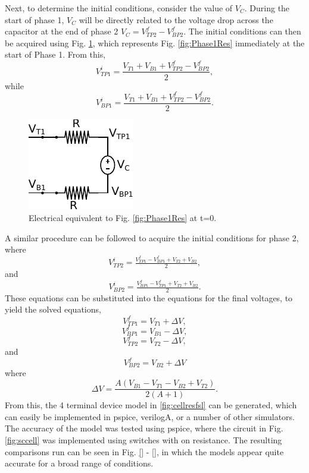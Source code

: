 	Next, to determine the initial conditions, consider the value of $V_{C}$. During the start of phase 1, $V_C$ will be directly related to the voltage drop across the capacitor at the end of phase 2 $V_C = V_{TP2}^f - V_{BP2}^f$. The initial conditions can then be acquired using Fig. \ref{fig:Phase1_t0}, which represents Fig. \ref{fig:Phase1Res} immediately at the start of Phase 1. From this,
	\begin{equation}
		V_{TP1}^i = \frac{V_{T1} + V_{B1} + V_{TP2}^f - V_{BP2}^f}{2},
	\end{equation}
	while 
	\begin{equation}
		V_{BP1}^i = \frac{V_{T1} + V_{B1} + V_{TP2}^f - V_{BP2}^f}{2}.
	\end{equation}
	\begin{figure}
		\centering
		\includegraphics[width=0.3\linewidth]{4Terminal/Figures/Phase1EQ_t=0.pdf}
		\caption{Electrical equivalent to Fig. \ref{fig:Phase1Res} at t=0.}
		\label{fig:Phase1_t0}
	\end{figure}
	A similar procedure can be followed to acquire the initial conditions for phase 2, where
	\begin{equation}
		V_{TP2}^i = \tfrac{V_{TP1}^f - V_{BP1}^f + V_{T2} + V_{B2}}{2},
	\end{equation}
	and
	\begin{equation}
		V_{BP2}^i = \tfrac{V_{BP1}^f - V_{TP1}^f + V_{T2} + V_{B2}}{2}.
	\end{equation}
	These equations can be substituted into the equations for the final voltages, to yield the solved equations,
	\begin{equation}
		V_{TP1}^f = V_{T1} + \Delta V, 
	\end{equation}
	\begin{equation}
		V_{BP1}^f = V_{B1} - \Delta V,
	\end{equation}
	\begin{equation}
		V_{TP2}^f = V_{T2} - \Delta V,
	\end{equation}
	and
	\begin{equation}
		V_{BP2}^f = V_{B2} + \Delta V
	\end{equation}
	where 
	\begin{equation}
		\Delta V = \frac{A(V_{B1} - V_{T1} - V_{B2} + V_{T2})}{2(A+1)}.
	\end{equation}
	From this, the 4 terminal device model in \ref{fig:cellresfsl} can be generated, which can easily be implemented in pspice, verilogA, or a number of other simulators. The accuracy of the model was tested using pspice, where the circuit in Fig. \ref{fig:sccell} was implemented using switches with on resistance. The resulting comparisons run can be seen in Fig. \ref{} - \ref{}, in which the models appear quite accurate for a broad range of conditions. 
	
